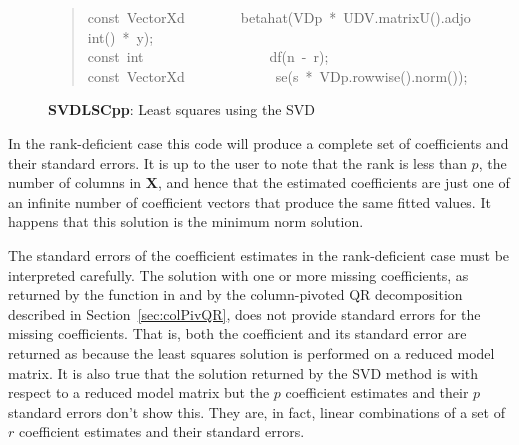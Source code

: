 \documentclass[shortnames,article]{jss}
\newcommand{\hlstd}[1]{\textcolor[rgb]{0,0,0}{#1}}
\newcommand{\hlopt}[1]{\textcolor[rgb]{0,0,0}{#1}}
\newcommand{\hlkwb}[1]{\textcolor[rgb]{0.13,0.54,0.13}{#1}}
\newcommand{\hlkwd}[1]{\textcolor[rgb]{0,0,0}{#1}}
\begin{document}
\begin{figure}[htb]
\begin{quote}
    \hlstd{}\hlkwb{const\ }\hlstd{VectorXd}\hlstd{\ \ \ \ \ \ \ \ }\hlstd{}\hlkwd{betahat}\hlstd{}\hlopt{(}\hlstd{VDp\ }\hlopt{{*}\ }\hlstd{UDV}\hlopt{.}\hlstd{}\hlkwd{matrixU}\hlstd{}\hlopt{().}\hlstd{}\hlkwd{adjoint}\hlstd{}\hlopt{()\ {*}\ }\hlstd{y}\hlopt{);}\hspace*{\fill}\\
    \hlstd{}\hlkwb{const\ int}\hlstd{\ \ \ \ \ \ \ \ \ \ \ \ \ \ \ \ \ \ }\hlkwb{}\hlstd{}\hlkwd{df}\hlstd{}\hlopt{(}\hlstd{n\ }\hlopt{{-}\ }\hlstd{r}\hlopt{);}\hspace*{\fill}\\
    \hlstd{}\hlkwb{const\ }\hlstd{VectorXd}\hlstd{\ \ \ \ \ \ \ \ \ \ \ \ \ }\hlstd{}\hlkwd{se}\hlstd{}\hlopt{(}\hlstd{s\ }\hlopt{{*}\ }\hlstd{VDp}\hlopt{.}\hlstd{}\hlkwd{rowwise}\hlstd{}\hlopt{().}\hlstd{}\hlkwd{norm}\hlstd{}\hlopt{());}\hlstd{}\hspace*{\fill}
    \normalfont
    \normalsize
  \end{quote}
  \caption{\textbf{SVDLSCpp}: Least squares using the SVD}
  \label{SVDLS}
\end{figure}

In the rank-deficient case this code will produce a complete set of
coefficients and their standard errors.  It is up to the user to note
that the rank is less than $p$, the number of columns in $\bm X$, and
hence that the estimated coefficients are just one of an infinite
number of coefficient vectors that produce the same fitted values.  It
happens that this solution is the minimum norm solution.

The standard errors of the coefficient estimates in the rank-deficient
case must be interpreted carefully.  The solution with one or more missing
coefficients, as returned by the  function in
 and by the column-pivoted QR decomposition described in
Section~\ref{sec:colPivQR}, does not provide standard errors for the
missing coefficients.  That is, both the coefficient and its standard
error are returned as  because the least squares solution is
performed on a reduced model matrix.  It is also true that the
solution returned by the SVD method is with respect to a reduced model
matrix but the $p$ coefficient estimates and their $p$ standard errors
don't show this.  They are, in fact, linear combinations of a set of
$r$ coefficient estimates and their standard errors.
\end{document}

